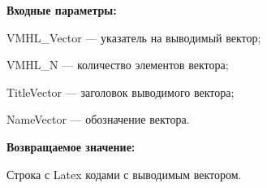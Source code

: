 \textbf{Входные параметры:}
 
VMHL\_Vector --- указатель на выводимый вектор;
 
VMHL\_N --- количество элементов вектора;
 
TitleVector --- заголовок выводимого вектора;
 
NameVector --- обозначение вектора.
	
\textbf{Возвращаемое значение:}

Строка с Latex кодами с выводимым вектором.